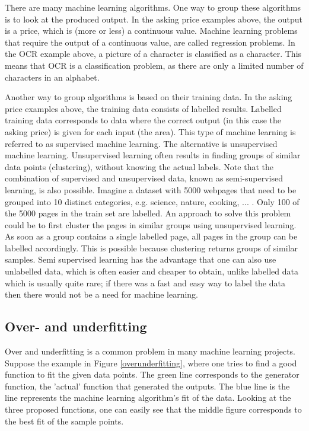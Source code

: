 \npar

There are many machine learning algorithms. One way to group these algorithms is to look at the produced output. In the asking price examples above, the output is a price, which is (more or less) a continuous value. Machine learning problems that require the output of a continuous value, are called regression problems\citep{prml}. In the OCR example above, a picture of a character is classified as a character. This means that OCR is a classification problem, as there are only a limited number of characters in an alphabet\citep{prml}.

\npar

Another way to group algorithms is based on their training data\citep{prml}. In the asking price examples above, the training data consists of labelled results. Labelled training data corresponds to data where the correct output (in this case the asking price) is given for each input (the area). This type of machine learning is referred to as supervised machine learning\citep{prml}. The alternative is unsupervised machine learning\citep{prml}. Unsupervised learning often results in finding groups of similar data points (clustering), without knowing the actual labels. Note that the combination of supervised and unsupervised data, known as semi-supervised learning, is also possible\citep{semiSup}. Imagine a dataset with 5000 webpages that need to be grouped into 10 distinct categories, e.g. science, nature, cooking, ... . Only 100 of the 5000 pages in the train set are labelled. An approach to solve this problem could be to first cluster the pages in similar groups using unsupervised learning. As soon as a group contains a single labelled page, all pages in the group can be labelled accordingly. This is possible because clustering returns groups of similar samples. Semi supervised learning has the advantage that one can also use unlabelled data, which is often easier and cheaper to obtain, unlike labelled data which is usually quite rare; if there was a fast and easy way to label the data then there would not be a need for machine learning.

\subsection{Over- and underfitting}

Over and underfitting is a common problem in many machine learning projects\citep{prml}. Suppose the example in Figure \ref{overunderfitting}, where one tries to find a good function to fit the given data points. The green line corresponds to the generator function, the 'actual' function that generated the outputs. The blue line is the line represents the machine learning algorithm's fit of the data. Looking at the three proposed functions, one can easily see that the middle figure corresponds to the best fit of the sample points.

